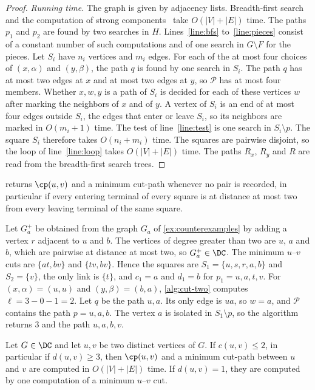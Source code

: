\begin{proof}
\emph{Running time.}
The graph is given by adjacency lists.
Breadth-first search~\cite[Section~8.4]{Erickson2019Algorithms} and the computation of strong components~\cite{Tarjan1972DFS} take $O(|V| + |E|)$ time.
The paths $p_1$ and $p_2$ are found by two searches in $H$.
Lines~\ref{line:bfs} to~\ref{line:pieces} consist of a constant number of such computations and of one search in $G \setminus F$ for the pieces.
Let $S_i$ have $n_i$ vertices and $m_i$ edges.
For each of the at most four choices of $(x, \alpha)$ and $(y, \beta)$, the path $q$ is found by one search in $S_i$.
The path $q$ has at most two edges at $x$ and at most two edges at $y$, so $\mathcal{P}$ has at most four members.
Whether $x, w, y$ is a path of $S_i$ is decided for each of these vertices $w$ after marking the neighbors of $x$ and of $y$.
A vertex of $S_i$ is an end of at most four edges outside $S_i$, the edges that enter or leave $S_i$, so its neighbors are marked in $O(m_i + 1)$ time.
The test of line~\ref{line:test} is one search in $S_i \setminus p$.
The square $S_i$ therefore takes $O(n_i + m_i)$ time.
The squares are pairwise disjoint, so the loop of line~\ref{line:loop} takes $O(|V| + |E|)$ time.
The paths $R_x$, $R_y$ and $R$ are read from the breadth-first search trees.
\end{proof}

 returns $\cp(u, v)$ and a minimum cut-path whenever no pair is recorded, in particular if every entering terminal of every square is at distance at most two from every leaving terminal of the same square.

\begin{example}
\label{ex:two-edges}
Let $G_a^{+}$ be obtained from the graph $G_a$ of \cref{ex:counterexamples} by adding a vertex $r$ adjacent to $u$ and $b$.
The vertices of degree greater than two are $u$, $a$ and $b$, which are pairwise at distance at most two, so $G_a^{+} \in \DC$.
The minimum $u$--$v$ cuts are $\{at, bv\}$ and $\{tv, bv\}$.
Hence the squares are $S_1 = \{u, s, r, a, b\}$ and $S_2 = \{v\}$, the only link is $\{t\}$, and $c_1 = a$ and $d_1 = b$ for $p_1 = u, a, t, v$.
For $(x, \alpha) = (u, u)$ and $(y, \beta) = (b, a)$, \cref{alg:cut-two} computes $\ell = 3 - 0 - 1 = 2$.
Let $q$ be the path $u, a$.
Its only edge is $ua$, so $w = a$, and $\mathcal{P}$ contains the path $p = u, a, b$.
The vertex $a$ is isolated in $S_1 \setminus p$, so the algorithm returns $3$ and the path $u, a, b, v$.
\end{example}

\begin{corollary}
\label{cor:class-pairs}
Let $G \in \DC$ and let $u, v$ be two distinct vertices of $G$.
If $c(u, v) \leq 2$, in particular if $d(u, v) \geq 3$, then $\cp(u, v)$ and a minimum cut-path between $u$ and $v$ are computed in $O(|V| + |E|)$ time.
If $d(u, v) = 1$, they are computed by one computation of a minimum $u$--$v$ cut.
\end{corollary}

